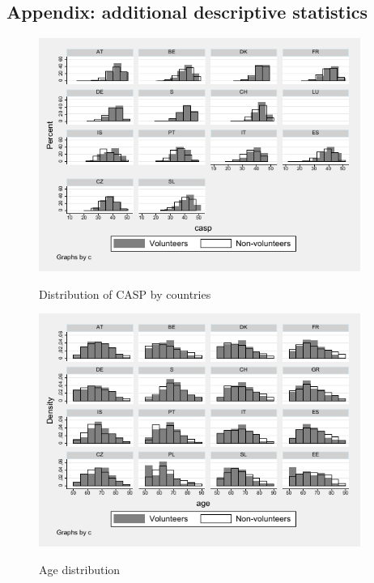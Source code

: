 \documentclass[10pt, letterpaper]{article}
\begin{document}
\begin{spacing}{1.4}
\begin{thebibliography}{87}
\end{thebibliography}


\begin{spacing}{.9}

\section{Appendix: additional descriptive statistics}


\begin{figure}[H]
 \includegraphics[height=3in]{hist_casp.pdf}
 \centering
 \label{fig:hist_casp}
\caption{Distribution of CASP by countries}
\end{figure}

\begin{spacing}{.9}
	 
      \label{KendallCasp} 
\end{spacing}




 

\begin{figure}[H]
 \includegraphics[height=3in]{hist_age.pdf}
 \centering
 \label{fig:hist_age}
\caption{Age distribution}
\end{figure}



\end{spacing}
\end{spacing}
\end{document}
